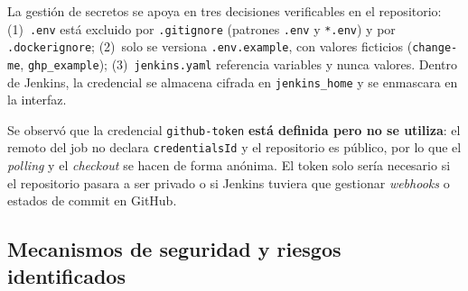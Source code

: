 \documentclass[11pt,a4paper]{article}
\begin{document}
La gestión de secretos se apoya en tres decisiones verificables en el repositorio:
(1)~\texttt{.env} está excluido por \texttt{.gitignore} (patrones \texttt{.env} y \texttt{*.env}) y
por \texttt{.dockerignore}; (2)~solo se versiona \texttt{.env.example}, con valores ficticios
(\texttt{change-me}, \texttt{ghp\_example}); (3)~\texttt{jenkins.yaml} referencia variables y nunca
valores. Dentro de Jenkins, la credencial se almacena cifrada en \texttt{jenkins\_home} y se enmascara
en la interfaz.

Se observó que la credencial \texttt{github-token} \textbf{está definida pero no se utiliza}: el
remoto del job no declara \texttt{credentialsId} y el repositorio es público, por lo que el
\emph{polling} y el \emph{checkout} se hacen de forma anónima. El token solo sería necesario si el
repositorio pasara a ser privado o si Jenkins tuviera que gestionar \emph{webhooks} o estados de
commit en GitHub.

\subsection{Mecanismos de seguridad y riesgos identificados}
\end{document}
